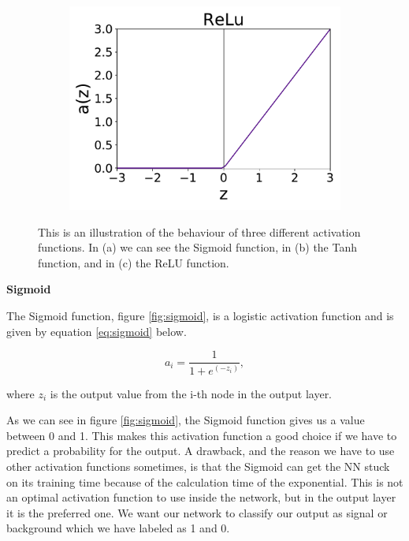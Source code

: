 \begin{figure}[H]
    \begin{subfigure}[t!]{0.3\textwidth}
    \includegraphics[width=\textwidth]{Figures/relu.pdf}
    \caption{}
    \label{fig:relu}
    \end{subfigure}
    \caption{This is an illustration of the behaviour of three different activation functions. In (a) we can see the Sigmoid function, in (b) the Tanh function, and in (c) the ReLU function.}
    \label{fig:activations}
\end{figure}



\textbf{Sigmoid}

The Sigmoid function, figure \ref{fig:sigmoid}, is a logistic activation function and is given by equation \ref{eq:sigmoid} below.

\begin{equation}
    \label{eq:sigmoid}
    a_i = \frac{1}{1+e^{(-z_i)}},
\end{equation}

where $z_i$ is the output value from the i-th node in the output layer.

As we can see in figure \ref{fig:sigmoid}, the Sigmoid function gives us a value between 0 and 1. This makes this activation function a good choice if we have to predict a probability for the output. A drawback, and the reason we have to use other activation functions sometimes, is that the Sigmoid can get the NN stuck on its training time because of the calculation time of the exponential. This is not an optimal activation function to use inside the network, but in the output layer it is the preferred one. We want our network to classify our output as signal or background which we have labeled as 1 and 0. 


